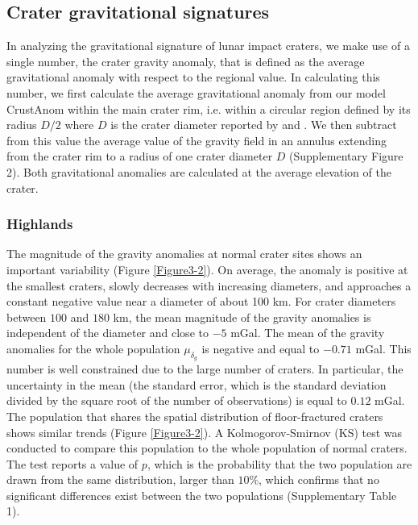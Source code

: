 \subsection{Crater gravitational signatures}
\label{sec:crat-grav-sign}
  
In analyzing the  gravitational signature of lunar  impact craters, we
make  use of  a single  number, the  crater gravity  anomaly, that  is
defined  as the  average  gravitational anomaly  with  respect to  the
regional value.   In calculating this  number, we first  calculate the
average gravitational anomaly from our model CrustAnom within the main
crater rim, i.e.  within a circular region defined by its radius $D/2$
where $D$ is  the crater diameter reported  by \citet{Head:2010fy} and
\citet{Jozwiak:2012dq}.  We then subtract  from this value the average
value of the gravity field in an annulus extending from the crater rim
to a radius of one crater diameter $D$ (Supplementary Figure 2).  Both
gravitational anomalies are calculated at the average elevation of the
crater.

\subsubsection{Highlands}
\label{sec:highlands-1}
  
The magnitude of the gravity anomalies at normal crater sites shows an
important  variability  (Figure  \ref{Figure3-2}).   On  average,  the
anomaly is  positive at  the smallest  craters, slowly  decreases with
increasing diameters, and approaches a  constant negative value near a
diameter  of about  100 km.   For crater  diameters between  $100$ and
$180$ km, the  mean magnitude of the gravity  anomalies is independent
of  the diameter  and close  to $-5$  mGal.  The  mean of  the gravity
anomalies for  the whole  population $\mu_{\delta_g}$ is  negative and
equal to  $-0.71$ mGal.  This  number is  well constrained due  to the
large number of  craters.  In particular, the uncertainty  in the mean
(the standard  error, which is  the standard deviation divided  by the
square root of  the number of observations) is equal  to $ 0.12$ mGal.
The population that shares the spatial distribution of floor-fractured
craters   shows   similar    trends   (Figure   \ref{Figure3-2}).    A
Kolmogorov-Smirnov (KS) test was  conducted to compare this population
to the whole  population of normal craters.  The test  reports a value
of $p$,  which is the  probability that  the two population  are drawn
from the same distribution, larger than $10\%$, which confirms that no
significant   differences   exist    between   the   two   populations
(Supplementary Table 1).
  

